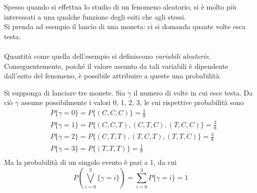 \documentclass{subfiles}
\begin{document}
Spesso quando si effettua lo studio di un fenomeno aleatorio, si è molto più interessati a una qualche funzione degli esiti che agli stessi.\\
Si prenda ad esempio il lancio di una moneta: ci si domanda quante volte esca testa.
\\ \\
Quantità come quella dell'esempio si definiscono \emph{variabili aleatorie}.
Conseguentemente, poiché il valore assunto da tali variabili è dipendente dall'esito del fenomeno, è possibile attribuire a queste una probabilità.

\begin{Example*}
    Si supponga di lanciare tre monete. Sia \(\gamma\) il numero di volte in cui esce testa.
    Da ciò \(\gamma\) assume possibilmente i valori 0, 1, 2, 3, le cui rispettive probabilità sono
    \[\begin{aligned}
             & P \{\gamma = 0\} = P \{(C, C, C)\} = \tfrac{1}{8}                       \\
             & P \{\gamma = 1\} = P \{(C, C, T), (C, T, C), (T, C, C)\} = \tfrac{3}{8} \\
             & P \{\gamma = 2\} = P \{(C, T, T), (T, C, T), (T, T, C)\} = \tfrac{3}{8} \\
             & P \{\gamma = 3\} = P \{(T, T, T)\} = \tfrac{1}{8}                       \\
        \end{aligned}\]
    Ma la probabilità di un singolo evento è pari a 1, da cui
    \[
        P\left( \bigvee\limits_{i = 0}^{3}{\{\gamma = i\}} \right) = \sum\limits_{i = 0}^{3}{P\{\gamma = i\}} = 1
    \]
\end{Example*}
\end{document}
